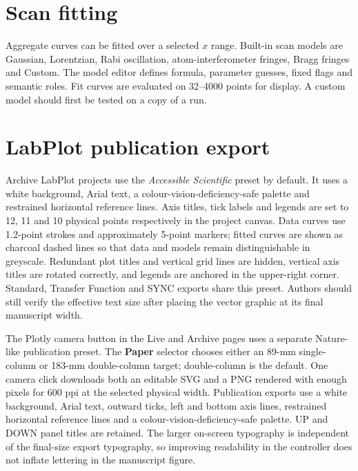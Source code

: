 \documentclass[11pt,oneside,openany]{book}
\newcommand{\ui}[1]{\textbf{#1}}
\begin{document}
\section{Scan fitting}
Aggregate curves can be fitted over a selected $x$ range. Built-in scan models are Gaussian,
Lorentzian, Rabi oscillation, atom-interferometer fringes, Bragg fringes and Custom. The
model editor defines formula, parameter guesses, fixed flags and semantic roles. Fit curves
are evaluated on 32--4000 points for display. A custom model should first be tested on a
copy of a run.

\section{LabPlot publication export}
Archive LabPlot projects use the \emph{Accessible Scientific} preset by default. It uses a
white background, Arial text, a colour-vision-deficiency-safe palette and restrained
horizontal reference lines. Axis titles, tick labels and legends are set to 12, 11 and
10 physical points respectively in the project canvas. Data curves use 1.2-point strokes
and approximately 5-point markers; fitted curves are shown as charcoal dashed lines so that data and
models remain distinguishable in greyscale. Redundant plot titles and vertical grid lines
are hidden, vertical axis titles are rotated correctly, and legends are anchored in the
upper-right corner. Standard, Transfer Function and SYNC exports
share this preset. Authors should still verify the effective text size after placing the
vector graphic at its final manuscript width.

The Plotly camera button in the Live and Archive pages uses a separate
Nature-like publication preset. The \ui{Paper} selector chooses either an 89-mm
single-column or 183-mm double-column target; double-column is the default. One
camera click downloads both an editable SVG and a PNG rendered with enough pixels
for 600 ppi at the selected physical width. Publication exports use a white
background, Arial text, outward ticks, left and bottom axis lines, restrained
horizontal reference lines and a colour-vision-deficiency-safe palette. UP and
DOWN panel titles are retained. The larger on-screen typography is independent of
the final-size export typography, so improving readability in the controller does
not inflate lettering in the manuscript figure.
\end{document}
